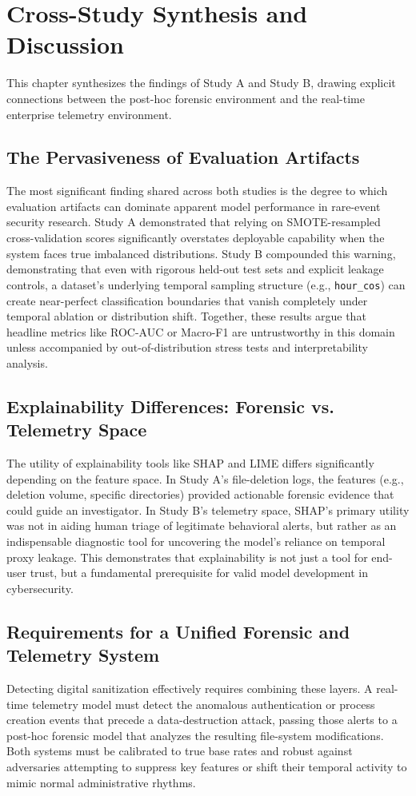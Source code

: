 \chapter{Cross-Study Synthesis and Discussion}
\label{ch:synthesis}

This chapter synthesizes the findings of Study A and Study B, drawing explicit connections between the post-hoc forensic environment and the real-time enterprise telemetry environment.

\section{The Pervasiveness of Evaluation Artifacts}
The most significant finding shared across both studies is the degree to which evaluation artifacts can dominate apparent model performance in rare-event security research. Study A demonstrated that relying on SMOTE-resampled cross-validation scores significantly overstates deployable capability when the system faces true imbalanced distributions. Study B compounded this warning, demonstrating that even with rigorous held-out test sets and explicit leakage controls, a dataset's underlying temporal sampling structure (e.g., \texttt{hour\_cos}) can create near-perfect classification boundaries that vanish completely under temporal ablation or distribution shift. Together, these results argue that headline metrics like ROC-AUC or Macro-F1 are untrustworthy in this domain unless accompanied by out-of-distribution stress tests and interpretability analysis.

\section{Explainability Differences: Forensic vs. Telemetry Space}
The utility of explainability tools like SHAP and LIME differs significantly depending on the feature space. In Study A's file-deletion logs, the features (e.g., deletion volume, specific directories) provided actionable forensic evidence that could guide an investigator. In Study B's telemetry space, SHAP's primary utility was not in aiding human triage of legitimate behavioral alerts, but rather as an indispensable diagnostic tool for uncovering the model's reliance on temporal proxy leakage. This demonstrates that explainability is not just a tool for end-user trust, but a fundamental prerequisite for valid model development in cybersecurity.

\section{Requirements for a Unified Forensic and Telemetry System}
Detecting digital sanitization effectively requires combining these layers. A real-time telemetry model must detect the anomalous authentication or process creation events that precede a data-destruction attack, passing those alerts to a post-hoc forensic model that analyzes the resulting file-system modifications. Both systems must be calibrated to true base rates and robust against adversaries attempting to suppress key features or shift their temporal activity to mimic normal administrative rhythms.

